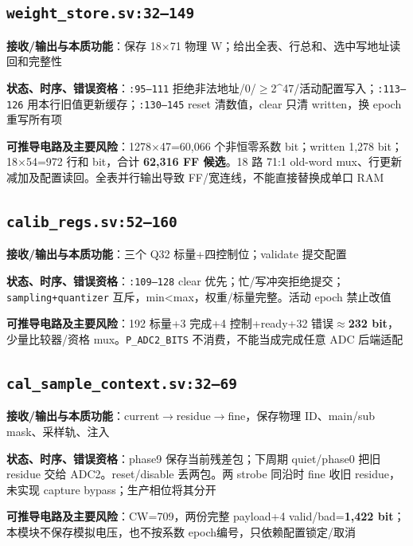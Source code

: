 \documentclass[UTF8,fontset=fandol,10pt,a4paper,openany]{ctexrep}
\newcommand{\code}[1]{\nolinkurl{#1}}
\begin{document}
\subsection*{\code{weight_store.sv:32–149}}
\noindent\textbf{接收/输出与本质功能}：保存 18\ensuremath{\times}71 物理 W；给出全表、行总和、选中写地址读回和完整性\par
\noindent\textbf{状态、时序、错误资格}：\code{:95–111} 拒绝非法地址/0/\ensuremath{\ge}2\textasciicircum{}47/活动配置写入；\code{:113–126} 用本行旧值更新缓存；\code{:130–145} reset 清数值，clear 只清 written，换 epoch 重写所有项\par
\noindent\textbf{可推导电路及主要风险}：1278\ensuremath{\times}47=60,066 个非恒零系数 bit；written 1,278 bit；18\ensuremath{\times}54=972 行和 bit，合计 \textbf{62,316 FF 候选}。18 路 71:1 old-word mux、行更新减加及配置读回。全表并行输出导致 FF/宽连线，不能直接替换成单口 RAM\par
\subsection*{\code{calib_regs.sv:52–160}}
\noindent\textbf{接收/输出与本质功能}：三个 Q32 标量+四控制位；validate 提交配置\par
\noindent\textbf{状态、时序、错误资格}：\code{:109–128} clear 优先；忙/写冲突拒绝提交；\code{sampling+quantizer} 互斥，min<max，权重/标量完整。活动 epoch 禁止改值\par
\noindent\textbf{可推导电路及主要风险}：192 标量+3 完成+4 控制+ready+32 错误\ensuremath{\approx}\textbf{232 bit}，少量比较器/资格 mux。\code{P_ADC2_BITS} 不消费，不能当成完成任意 ADC 后端适配\par
\subsection*{\code{cal_sample_context.sv:32–69}}
\noindent\textbf{接收/输出与本质功能}：current\ensuremath{\rightarrow}residue\ensuremath{\rightarrow}fine，保存物理 ID、main/sub mask、采样轨、注入\par
\noindent\textbf{状态、时序、错误资格}：phase9 保存当前残差包；下周期 quiet/phase0 把旧 residue 交给 ADC2。reset/disable 丢两包。两 strobe 同沿时 fine 收旧 residue，未实现 capture bypass；生产相位将其分开\par
\noindent\textbf{可推导电路及主要风险}：CW=709，两份完整 payload+4 valid/bad=\textbf{1,422 bit}；本模块不保存模拟电压，也不按系数 epoch编号，只依赖配置锁定/取消\par
\end{document}
